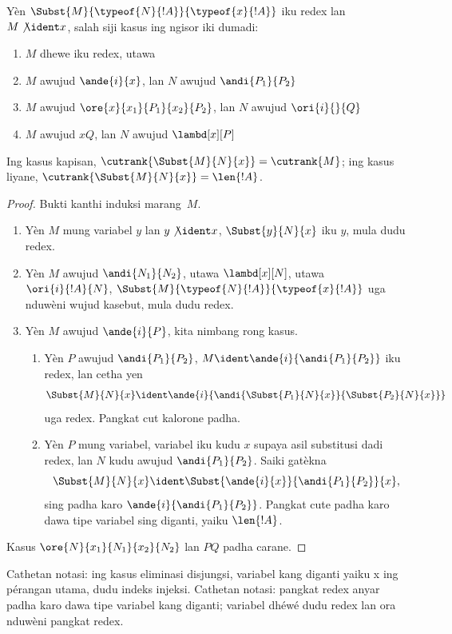 \documentclass[../../../include/open-logic-section]{subfiles}
\begin{document}
\begin{lem}
  Yèn $\Subst{M}{\typeof{N}{!A}}{\typeof{x}{!A}}$ iku redex lan $M
  \not\ident x$, salah siji kasus ing ngisor iki dumadi:
  \begin{enumerate}
  \item $M$ dhewe iku redex, utawa
  \item $M$ awujud $\ande{i}{x}$, lan $N$ awujud
    $\andi{P_1}{P_2}$
  \item $M$ awujud $\ore{x}{x_1}{P_1}{x_2}{P_2}$, lan $N$
    awujud $\ori{i}{}{Q}$
  \item $M$ awujud $x Q$, lan $N$ awujud
    $\lambd[x][P]$
  \end{enumerate}
  Ing kasus kapisan, $\cutrank{\Subst{M}{N}{x}} = \cutrank{M}$; ing
  kasus liyane, $\cutrank{\Subst{M}{N}{x}} = \len{!A}$.
\end{lem}
\begin{proof}
  Bukti kanthi induksi marang~$M$.
  \begin{enumerate}
  \item Yèn $M$ mung variabel $y$ lan $y \not\ident x$,
    $\Subst{y}{N}{x}$ iku $y$, mula dudu redex.
  \item Yèn $M$ awujud $\andi{N_1}{N_2}$, utawa $\lambd[x][N]$, utawa
    $\ori{i}{!A}{N}$, $\Subst{M}{\typeof{N}{!A}}{\typeof{x}{!A}}$ uga
    nduwèni wujud kasebut, mula dudu redex.
  \item Yèn $M$ awujud $\ande{i}{P}$, kita nimbang rong kasus.
    \begin{enumerate}
      \item Yèn $P$ awujud $\andi{P_1}{P_2}$, $M \ident
        \ande{i}{\andi{P_1}{P_2}}$ iku redex, lan cetha yen
        \[
        \Subst{M}{N}{x} \ident
        \ande{i}{\andi{\Subst{P_1}{N}{x}}{\Subst{P_2}{N}{x}}}
        \]
        uga redex. Pangkat cut kalorone padha.
      \item Yèn $P$ mung variabel, variabel iku kudu $x$ supaya asil
        substitusi dadi redex, lan $N$ kudu awujud
        $\andi{P_1}{P_2}$. Saiki gatèkna
        \[
        \Subst{M}{N}{x} \ident \Subst{\ande{i}{x}}{\andi{P_1}{P_2}}{x},
        \]
        sing padha karo $\ande{i}{\andi{P_1}{P_2}}$. Pangkat cute padha karo
        dawa tipe variabel sing diganti, yaiku $\len{!A}$.
    \end{enumerate}
  \end{enumerate}
  Kasus $\ore{N}{x_1}{N_1}{x_2}{N_2}$ lan $P Q$ padha carane.
\end{proof}
Cathetan notasi: ing kasus eliminasi disjungsi, variabel kang diganti yaiku x ing pérangan utama, dudu indeks injeksi.
Cathetan notasi: pangkat redex anyar padha karo dawa tipe variabel kang diganti; variabel dhéwé dudu redex lan ora nduwèni pangkat redex.
\end{document}
